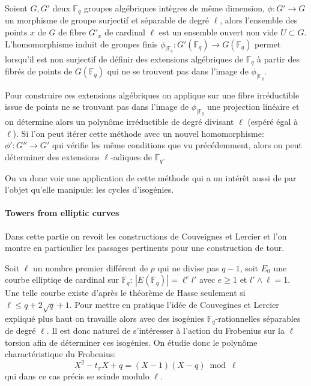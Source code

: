 \documentclass[10pt,a4paper]{book}
\theoremstyle{plain}
\theoremstyle{definition}
\theoremstyle{definition}
\theoremstyle{definition}
\theoremstyle{definition}
\theoremstyle{remark}
\theoremstyle{remark}
\begin{document}
Soient $G,G'$ deux $\mathbb{F}_q$ groupes algébriques intègres de même dimension, $\phi: G' \to G$ un morphisme de groupe surjectif et séparable de degré $\ell$, alors l'ensemble des points $x$ de $G$ de fibre $G'_x$ de cardinal $\ell$ est un ensemble ouvert non vide $U \subset G$. 
L'homomorphisme induit de groupes finis $\phi_{\mid \mathbb{F}_q}: G'(\mathbb{F}_q) \to G(\mathbb{F}_q)$ permet lorsqu'il est non surjectif de définir des extensions algébriques de $\mathbb{F}_q$ à partir des fibrés de points de $G(\mathbb{F}_q)$ qui ne se trouvent pas dans l'image de $\phi_{\mid \mathbb{F}_q}$. 

Pour construire ces extensions algébriques on applique sur une fibre irréductible issue de points ne se trouvant pas dans l'image de $\phi_{\mid \mathbb{F}_q}$ une projection linéaire et on détermine alors un polynôme irréductible de degré divisant $\ell$ (espéré égal à $\ell$). Si l'on peut itérer cette méthode avec un nouvel homomorphisme: $\phi':G'' \to G'$ qui vérifie les même conditions que vu précédemment, alors on peut déterminer des extensions $\ell$-adiques de $\mathbb{F}_q$.

On va donc voir une application de cette méthode qui a un intérêt aussi de par l'objet qu'elle manipule: les cycles d'isogénies.

\paragraph{Towers from elliptic curves}
Dans cette partie on revoit les constructions de Couveignes et Lercier \cite{couveignesLercier2013} et l'on montre en particulier les passages pertinents pour une construction de tour.

Soit $\ell$ un nombre premier différent de $p$ qui ne divise pas $q-1$, soit $E_0$ une courbe elliptiqe de cardinal sur $\mathbb{F}_q$: $|E(\mathbb{F}_q)|=\ell^e l'$ avec $e \geqslant 1$ et $l' \wedge \ell =1$. Une telle courbe existe d'après le théorème de Hasse seulement si $\ell \leqslant q+2\sqrt{q} +1$.  
Pour mettre en pratique l'idée de Couvegines et Lercier expliqué plus haut on travaille alors avec des isogénies $\mathbb{F}_q$-rationnelles séparables de degré $\ell$. Il est donc naturel de s'intéresser à l'action du Frobenius sur la $\ell$ torsion afin de déterminer ces isogénies. On étudie donc le polynôme charactéristique du Frobenius:
\begin{equation*}
X^2-t_{\pi}X+q=(X-1)(X-q) \bmod \ell
\end{equation*}
qui dans ce cas précis se scinde modulo $\ell$.
\end{document}
